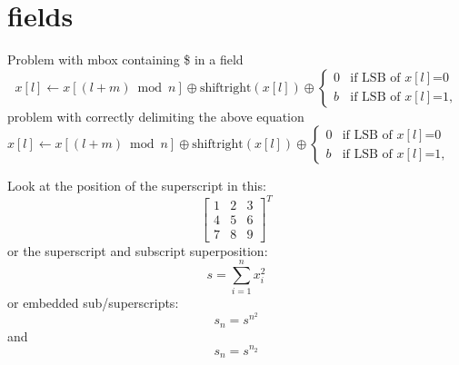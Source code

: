 \documentclass{article}
\begin{document}
\section{fields}
Problem with mbox containing \$ in a field
\[
x[l]\leftarrow x[(l+m) \bmod  n] \oplus \mbox{shiftright}(x[l])
 \oplus \left\{ \begin{array}{ll}
                0   & \mbox{if LSB of $x[l]$=0} \\
                b   & \mbox{if LSB of $x[l]$=1,}
               \end{array}
        \right.
\]
problem with correctly delimiting the above equation 
$
x[l]\leftarrow x[(l+m) \bmod  n] \oplus \mbox{shiftright}(x[l])
 \oplus \left\{ \begin{array}{ll}
                0   & \mbox{if LSB of $x[l]$=0} \\
                b   & \mbox{if LSB of $x[l]$=1,}
               \end{array}
        \right.
$

Look at the position of the superscript in this:
\[
  \left[
    \begin{array}{ccc}
      1 & 2 & 3\\
      4 & 5 & 6\\
      7 & 8 & 9
    \end{array}
  \right]^T
\]
or the superscript and subscript superposition:
\[
  s = \sum_{i=1}^n x^2_i
\]
or embedded sub/superscripts:
\[
  s_n=s^{n^2}
\]
and
\[
  s_n=s^{n_2}
\]
\end{document}
